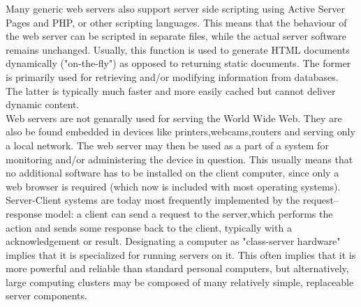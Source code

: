 \documentclass[12pt, a4paper]{article}
\begin{document}
\hspace{5mm}Many generic web servers also support server side scripting using Active Server Pages and PHP, or other scripting languages. This means that the behaviour of the web server can be scripted in separate files, while the actual server software remains unchanged. Usually, this function is used to generate HTML documents dynamically ("on-the-fly") as opposed to returning static documents. The former is primarily used for retrieving and/or modifying information from databases. The latter is typically much faster and more easily cached but cannot deliver dynamic content.
\\

\hspace{5mm}Web servers are not genarally used for serving the World Wide Web. They are also be found embedded in devices like printers,webcams,routers and serving only a local network. The web server may then be used as a part of a system for monitoring and/or administering the device in question. This usually means that no additional software has to be installed on the client computer, since only a web browser is required (which now is included with most operating systems).
\\

\hspace{5mm}Server-Client systems are today most frequently implemented by the request–response model: a client can send a request to the server,which performs the action and sends some response back to the client, typically with a acknowledgement or result. Designating a computer as "class-server hardware" implies that it is specialized for running servers on it. This often implies that it is more powerful and reliable than standard personal computers, but alternatively, large computing clusters may be composed of many relatively simple, replaceable server components.
\\
\newpage
\end{document}
